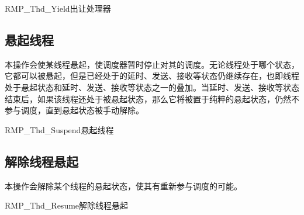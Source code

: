 \begin{apidesc}{RMP\_Thd\_Yield}{出让处理器}
    \begin{apiparams}
    \end{apiparams}
    \begin{apiret}
    \end{apiret}
\end{apidesc}

\subsection{悬起线程}\label{subsec:suspend-a-thread}

本操作会使某线程悬起，使调度器暂时停止对其的调度。无论线程处于哪个状态，它都可以被悬起，但是已经处于的延时、发送、接收等状态仍继续存在，也即线程处于悬起状态和延时、发送、接收等状态之一的叠加。当延时、发送、接收等状态结束后，如果该线程还处于被悬起状态，那么它将被置于纯粹的悬起状态，仍然不参与调度，直到悬起状态被手动解除。

\begin{apidesc}{RMP\_Thd\_Suspend}{悬起线程}
    \begin{apiparams}
    \end{apiparams}
    \begin{apiret}
    \end{apiret}
\end{apidesc}

\subsection{解除线程悬起}\label{subsec:resume-a-suspended-thread}

本操作会解除某个线程的悬起状态，使其有重新参与调度的可能。

\begin{apidesc}{RMP\_Thd\_Resume}{解除线程悬起}
    \begin{apiparams}
    \end{apiparams}
    \begin{apiret}
    \end{apiret}
\end{apidesc}

